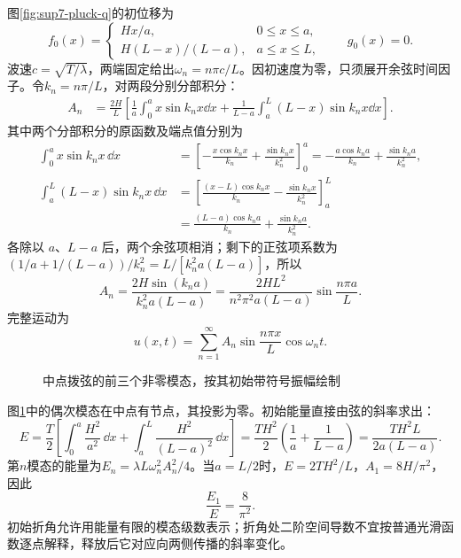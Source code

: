 \begin{solution}
图\ref{fig:sup7-pluck-q}的初位移为
\[
 f_0(x)=\begin{cases}Hx/a,&0\le x\le a,\\
 H(L-x)/(L-a),&a\le x\le L,\end{cases}\qquad g_0(x)=0.
\]
波速$c=\sqrt{T/\lambda}$，两端固定给出$\omega_n=n\pi c/L$。因初速度为零，只须展开余弦时间因子。令$k_n=n\pi/L$，对两段分别分部积分：
\[
 \begin{aligned}
 A_n&=\frac{2H}{L}\left[\frac1a\int_0^ax\sin k_nx\dd x
 +\frac1{L-a}\int_a^L(L-x)\sin k_nx\dd x\right].
 \end{aligned}
\]
其中两个分部积分的原函数及端点值分别为
\[
\begin{aligned}
\int_0^ax\sin k_nx\,\dd x
&=\left[-\frac{x\cos k_nx}{k_n}+\frac{\sin k_nx}{k_n^2}\right]_0^a
=-\frac{a\cos k_na}{k_n}+\frac{\sin k_na}{k_n^2},\\
\int_a^L(L-x)\sin k_nx\,\dd x
&=\left[\frac{(x-L)\cos k_nx}{k_n}-\frac{\sin k_nx}{k_n^2}\right]_a^L\\
&=\frac{(L-a)\cos k_na}{k_n}+\frac{\sin k_na}{k_n^2}.
\end{aligned}
\]
各除以 $a$、$L-a$ 后，两个余弦项相消；剩下的正弦项系数为 $(1/a+1/(L-a))/k_n^2=L/[k_n^2a(L-a)]$，所以
\[
A_n=\frac{2H\sin(k_na)}{k_n^2a(L-a)}
=\frac{2HL^2}{n^2\pi^2a(L-a)}\sin\frac{n\pi a}{L}.
\]
完整运动为
\[
 u(x,t)=\sum_{n=1}^{\infty}A_n\sin\frac{n\pi x}L\cos\omega_nt.
\]
\begin{figure}[H]\centering
{}
\caption{中点拨弦的前三个非零模态，按其初始带符号振幅绘制}\label{fig:sup7-pluck-s}
\end{figure}
图\ref{fig:sup7-pluck-s}中的偶次模态在中点有节点，其投影为零。初始能量直接由弦的斜率求出：
\[
 E=\frac T2\left[\int_0^a\frac{H^2}{a^2}\,\dd x
 +\int_a^L\frac{H^2}{(L-a)^2}\,\dd x\right]
 =\frac{TH^2}{2}\left(\frac1a+\frac1{L-a}\right)
 =\frac{TH^2L}{2a(L-a)}.
\]
第$n$模态的能量为$E_n=\lambda L\omega_n^2A_n^2/4$。当$a=L/2$时，$E=2TH^2/L$，$A_1=8H/\pi^2$，因此
\[
 \frac{E_1}{E}=\frac8{\pi^2}.
\]
初始折角允许用能量有限的模态级数表示；折角处二阶空间导数不宜按普通光滑函数逐点解释，释放后它对应向两侧传播的斜率变化。
\end{solution}



